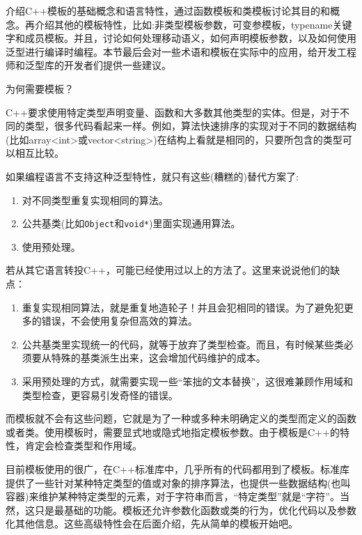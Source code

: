 

介绍C++模板的基础概念和语言特性，通过函数模板和类模板讨论其目的和概念。再介绍其他的模板特性，比如:非类型模板参数，可变参模板，typename关键字和成员模板。并且，讨论如何处理移动语义，如何声明模板参数，以及如何使用泛型进行编译时编程。本节最后会对一些术语和模板在实际中的应用，给开发工程师和泛型库的开发者们提供一些建议。

\begin{flushleft}
 为何需要模板？
\end{flushleft}

C++要求使用特定类型声明变量、函数和大多数其他类型的实体。但是，对于不同的类型，很多代码看起来一样。例如，算法快速排序的实现对于不同的数据结构(比如array<int>或vector<string>)在结构上看就是相同的，只要所包含的类型可以相互比较。

如果编程语言不支持这种泛型特性，就只有这些(糟糕的)替代方案了:

\begin{enumerate}
\item 
对不同类型重复实现相同的算法。

\item 
公共基类(比如\texttt{Object}和\texttt{void*})里面实现通用算法。

\item 
使用预处理。
\end{enumerate}

若从其它语言转投C++，可能已经使用过以上的方法了。这里来说说他们的缺点：

\begin{enumerate}
\item 
重复实现相同算法，就是重复地造轮子！并且会犯相同的错误。为了避免犯更多的错误，不会使用复杂但高效的算法。

\item 
公共基类里实现统一的代码，就等于放弃了类型检查。而且，有时候某些类必须要从特殊的基类派生出来，这会增加代码维护的成本。

\item 
采用预处理的方式，就需要实现一些“笨拙的文本替换”，这很难兼顾作用域和类型检查，更容易引发奇怪的错误。
\end{enumerate}

而模板就不会有这些问题，它就是为了一种或多种未明确定义的类型而定义的函数或者类。使用模板时，需要显式地或隐式地指定模板参数。由于模板是C++的特性，肯定会检查类型和作用域。

目前模板使用的很广，在C++标准库中，几乎所有的代码都用到了模板。标准库提供了一些针对某种特定类型的值或对象的排序算法，也提供一些数据结构(也叫容器)来维护某种特定类型的元素，对于字符串而言，“特定类型”就是“字符”。当然，这只是最基础的功能。模板还允许参数化函数或类的行为，优化代码以及参数化其他信息。这些高级特性会在后面介绍，先从简单的模板开始吧。










